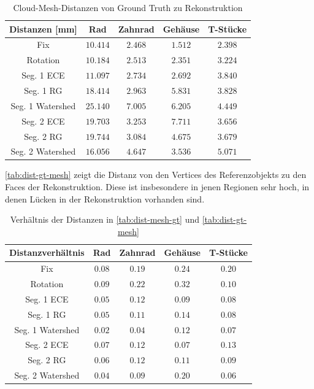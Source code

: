 \begin{table}[H]
	\centering
	\begin{tabular}{| c || c | c | c | c |}
		\hline
		\textbf{Distanzen [mm]} & Rad & Zahnrad & Gehäuse & T-Stücke\\
		\hline\hline
		Fix & $10.414$ & $2.468$ & $1.512$ & $2.398$\\
		\hline
		Rotation & $10.184$ & $2.513$ & $2.351$ & $3.224$\\
		\hline
		Seg. 1 \ac{ECE} & $11.097$ & $2.734$ & $2.692$ & $3.840$\\
		\hline
		Seg. 1 \ac{RG} & $18.414$ & $2.963$ & $5.831$ & $3.828$\\
		\hline
		Seg. 1 Watershed & $25.140$ & $7.005$ & $6.205$ & $4.449$\\
		\hline
		Seg. 2 \ac{ECE} & $19.703$ & $3.253$ & $7.711$ & $3.656$\\
		\hline
		Seg. 2 \ac{RG} & $19.744$ & $3.084$ & $4.675$ & $3.679$ \\
		\hline
		Seg. 2 Watershed & $16.056$ & $4.647$ & $3.536$ & $5.071$\\
		\hline
	\end{tabular}
	\caption{Cloud-Mesh-Distanzen von Ground Truth zu Rekonstruktion}
	\label{tab:dist-gt-mesh}
\end{table}

\autoref{tab:dist-gt-mesh} zeigt die Distanz von den Vertices des Referenzobjekts zu den Faces der Rekonstruktion.
Diese ist insbesondere in jenen Regionen sehr hoch, in denen Lücken in der Rekonstruktion vorhanden sind.

\begin{table}[H]
    \centering
    \begin{tabular}{| c || c | c | c | c |}
        \hline
        \textbf{Distanzverhältnis} & Rad & Zahnrad & Gehäuse & T-Stücke\\
        \hline\hline
        Fix & $0.08$ & $0.19$ & $0.24$ & $0.20$\\
        \hline
        Rotation & $0.09$ & $0.22$ & $0.32$ & $0.10$\\
        \hline
        Seg. 1 \ac{ECE} & $0.05$ & $0.12$ & $0.09$ & $0.08$\\
        \hline
        Seg. 1 \ac{RG} & $0.05$ & $0.11$ & $0.14$ & $0.08$\\
        \hline
        Seg. 1 Watershed & $0.02$ & $0.04$ & $0.12$ & $0.07$\\
        \hline
        Seg. 2 \ac{ECE} & $0.07$ & $0.12$ & $0.07$ & $0.13$\\
        \hline
        Seg. 2 \ac{RG} & $0.06$ & $0.12$ & $0.11$ & $0.09$\\
        \hline
        Seg. 2 Watershed & $0.04$ & $0.09$ & $0.20$ & $0.06$\\
        \hline
    \end{tabular}
    \caption{Verhältnis der Distanzen in \autoref{tab:dist-mesh-gt} und \autoref{tab:dist-gt-mesh}}
    \label{tab:dist-verhältnis}
\end{table}

